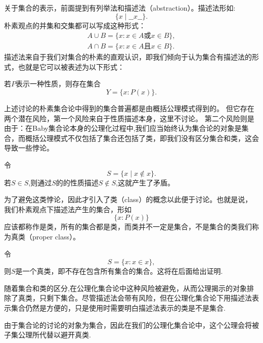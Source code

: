 关于集合的表示，前面提到有列举法和描述法（abstraction）。描述法形如:
\[\{x\mid\_\_x\_\_\}.\]
朴素观点的并集和交集都可以写成这种形式：
\begin{gather*}
    A\cup B=\{x:x\in A\textit{或}x\in B\},\\
    A\cap B=\{x:x\in A\textit{且}x\in B\}.
\end{gather*}
描述法来自于我们对集合的朴素的直观认识，即我们倾向于认为集合有描述法的形式，也就是它可以被表述为以下形式：
\begin{axiom}
    若$P$表示一种性质，则存在集合\[Y=\{x:P(x)\}.\]
\end{axiom}
上述讨论的朴素集合论中得到的集合普遍都是由概括公理模式得到的。
但它存在两个潜在风险，第一个风险来自于性质描述本身，这里不讨论。
第二个风险则是由于：在Baby集合论本身的公理化过程中,我们应当始终认为集合论的对象是集合，而概括公理模式不仅包括了集合还包括了类，即我们没有区分集合和类，这会导致一些悖论。
\begin{example}令
    \[S=\{x\mid x\notin x\}.\]
    若$S\in S$,则通过$S$的的性质描述$S\notin S$,这就产生了矛盾。
\end{example}
为了避免这类悖论，因此才引入了类（class）的概念以此便于讨论。也就是说，我们朴素观点下描述法产生的集合，形如
\[\{x:P(x)\}\]
应该都称作是类，所有的集合都是类，而类并不一定是集合，不是集合的类我们称为真类（proper class）。
\begin{example}
    令
    \[S=\{x:x\in x\},\]
    则$S$是一个真类，即不存在包含所有集合的集合。这将在后面给出证明.
\end{example}
随着集合和类的区分,在公理化集合论中这种风险被避免，从而公理揭示的对象排除了真类，只剩下集合。尽管描述法会带有风险，但在公理化集合论下用描述法表示集合仍然是方便的，只是使用时需要明白描述法表示的类是不是集合.
\begin{note}
    由于集合论的讨论的对象为集合，因此在我们的公理化集合论中，这个公理会将被子集公理所代替以避开真类.
\end{note}




